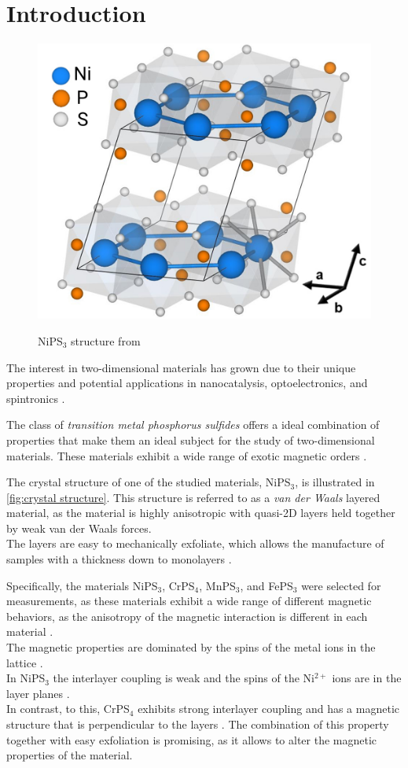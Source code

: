 \documentclass[
	oneside,
	parskip=half,
	a4paper,
]{scrbook}
\begin{document}
\vfill

\mainmatter

\chapter{Introduction}
\begin{figure}
	\includegraphics[width=.4\textwidth]{../../figures/crystal structures/NiPS3 3d.png}\\
	\caption{NiPS$_3$ structure from \cite{NiPS3_coherent}}
	\label{fig:crystal structure}
\end{figure}
The interest in two-dimensional materials has grown due to their unique properties and potential applications in nanocatalysis, optoelectronics, and spintronics \cite{MPX_review}.

The class of \textit{transition metal phosphorus sulfides} offers a ideal combination of properties that make them an ideal subject for the study of two-dimensional materials.
These materials exhibit a wide range of exotic magnetic orders \cite{AFM_review}.

The crystal structure of one of the studied materials, NiPS$_3$, is illustrated in \autoref{fig:crystal structure}.
This structure is referred to as a \textit{van der Waals} layered material, as the material is highly anisotropic with quasi-2D layers held together by weak van der Waals forces.\\
The layers are easy to mechanically exfoliate, which allows the manufacture of samples with a thickness down to monolayers \cite{NiPS3_few_layer}.

Specifically, the materials NiPS$_3$, CrPS$_4$, MnPS$_3$, and FePS$_3$ were selected for measurements,  
as these materials exhibit a wide range of different magnetic behaviors, as the anisotropy of the magnetic interaction is different in each material \cite{MPS_magnetism,CrPS4_magnetic}.\\
The magnetic properties are dominated by the spins of the metal ions in the lattice \cite{MPS_magnetism, NiPS3_magnon_gap, CrPS4_magnetic}.\\
In NiPS$_3$ the interlayer coupling is weak and the spins of the Ni$^{2+}$ ions are in the layer planes \cite{MPS_magnetism}.\\
In contrast, to this, CrPS$_4$ exhibits strong interlayer coupling and has a magnetic structure that is perpendicular to the layers \cite{CrPS4_magnetic}.
The combination of this property together with easy exfoliation is promising, as it allows to alter the magnetic properties of the material.
\end{document}
